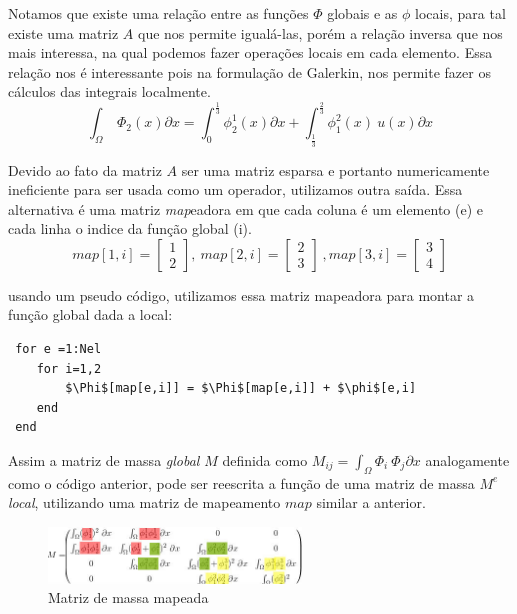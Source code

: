 Notamos que existe uma relação entre as funções  $\Phi$ globais e as $\phi$ locais, para tal existe uma matriz $A$ que nos permite igualá-las, porém a relação inversa que nos mais interessa, na qual podemos fazer operações locais em cada elemento. Essa relação nos é interessante pois na formulação de Galerkin, nos permite fazer os cálculos das integrais localmente.
\begin{equation}
\int_\Omega\ \Phi_2(x) \partial x = \int_{0}^{\frac{1}{3}} \phi^1_2(x) \partial x + \int_{\frac{1}{3}}^{\frac{2}{3}} \phi^2_1(x)\ u(x) \partial x
\end{equation}

Devido ao fato da matriz $A$ ser uma matriz esparsa e portanto numericamente ineficiente para ser usada como um operador, utilizamos outra saída. Essa alternativa é uma matriz \emph{map}eadora em que cada coluna é um elemento (e) e cada linha o indice da função global (i).
\begin{equation}
map[1,i]= \begin{bmatrix}
1\\
2
\end{bmatrix},\
map[2,i]= \begin{bmatrix}
2\\
3
\end{bmatrix}\
,map[3,i]= \begin{bmatrix}
3\\
4
\end{bmatrix}
\end{equation}

usando um pseudo código, utilizamos essa matriz mapeadora para montar a função global dada a local:
\begin{lstlisting}
 for e =1:Nel
 	for i=1,2
 		$\Phi$[map[e,i]] = $\Phi$[map[e,i]] + $\phi$[e,i]
 	end
 end
\end{lstlisting}
Assim a matriz de massa \emph{global} $M$ definida como $M_{ij} = \int_\Omega \Phi_i\ \Phi_j \partial x$ analogamente como  o código anterior, pode ser reescrita a função de uma matriz de massa $M^e$ \emph{local}, utilizando uma matriz de mapeamento $map$ similar a anterior.
\begin{figure}[!h]
\includegraphics[width=0.6\textwidth, center ]{figuras/Matrix_element.png}
\caption{Matriz de massa mapeada}
\end{figure}

